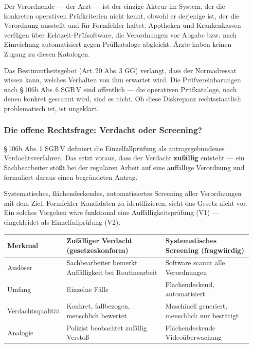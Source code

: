 \documentclass{umbruch-position}
\begin{document}
\medskip

Der Verordnende --- der Arzt --- ist der einzige Akteur im System, der die konkreten operativen Prüfkriterien nicht kennt, obwohl er derjenige ist, der die Verordnung ausstellt und für Formfehler haftet. Apotheken und Krankenkassen verfügen über Echtzeit-Prüfsoftware, die Verordnungen vor Abgabe bzw. nach Einreichung automatisiert gegen Prüfkataloge abgleicht. Ärzte haben keinen Zugang zu diesen Katalogen.

Das Bestimmtheitsgebot (Art.\,20 Abs.\,3 GG) verlangt, dass der Normadressat wissen kann, welches Verhalten von ihm erwartet wird. Die Prüfvereinbarungen nach \S\,106b Abs.\,6 SGB\,V sind öffentlich --- die operativen Prüfkataloge, nach denen konkret gescannt wird, sind es nicht. Ob diese Diskrepanz rechtsstaatlich problematisch ist, ist ungeklärt.

\subsubsection{Die offene Rechtsfrage: Verdacht oder Screening?}
\label{sec:screening-rechtsfrage}

\S\,106b Abs.\,1 SGB\,V definiert die Einzelfallprüfung als antragsgebundenes Verdachtsverfahren. Das setzt voraus, dass der Verdacht \textbf{zufällig} entsteht --- ein Sachbearbeiter stößt bei der regulären Arbeit auf eine auffällige Verordnung und formuliert daraus einen begründeten Antrag.

Systematisches, flächendeckendes, automatisiertes Screening aller Verordnungen mit dem Ziel, Formfehler-Kandidaten zu identifizieren, sieht das Gesetz nicht vor. Ein solches Vorgehen wäre funktional eine Auffälligkeitsprüfung (V1) --- eingekleidet als Einzelfallprüfung (V2).

{\small
\begin{tabularx}{\textwidth}{l X X}
\toprule
\textbf{Merkmal} & \textbf{Zufälliger Verdacht (gesetzeskonform)} & \textbf{Systematisches Screening (fragwürdig)} \\
\midrule
Auslöser & Sachbearbeiter bemerkt Auffälligkeit bei Routinearbeit & Software scannt alle Verordnungen \\
\addlinespace
Umfang & Einzelne Fälle & Flächendeckend, automatisiert \\
\addlinespace
Verdachtsqualität & Konkret, fallbezogen, menschlich bewertet & Maschinell generiert, menschlich nur bestätigt \\
\addlinespace
Analogie & Polizist beobachtet zufällig Verstoß & Flächendeckende Videoüberwachung \\
\bottomrule
\end{tabularx}
}
\end{document}
